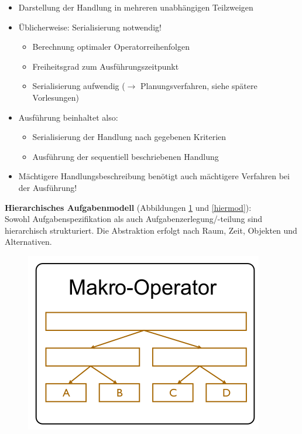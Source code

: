 \begin{itemize}
\item Darstellung der Handlung in mehreren unabhängigen Teilzweigen
\item Üblicherweise: Serialisierung notwendig!
\begin{itemize}
\item Berechnung optimaler Operatorreihenfolgen
\item Freiheitsgrad zum Ausführungszeitpunkt
\item Serialisierung aufwendig ($\rightarrow$ Planungsverfahren, siehe spätere Vorlesungen)
\end{itemize}
\item Ausführung beinhaltet also:
\begin{itemize}
\item Serialisierung der Handlung nach gegebenen Kriterien
\item Ausführung der sequentiell beschriebenen Handlung
\end{itemize}
\item Mächtigere Handlungsbeschreibung benötigt auch mächtigere Verfahren bei der Ausführung!
\end{itemize}
\textbf{Hierarchisches Aufgabenmodell} (Abbildungen \ref{hier} und \ref{hiermod}):\\
Sowohl Aufgabenspezifikation als auch Aufgabenzerlegung/-teilung sind hierarchisch strukturiert. Die Abstraktion erfolgt nach Raum, Zeit, Objekten und Alternativen.
\begin{figure}[h!]\centering 
\includegraphics[width=0.3\linewidth]{figures/ch02_hier.png}
\caption{}
\label{hier}
\end{figure}\\
